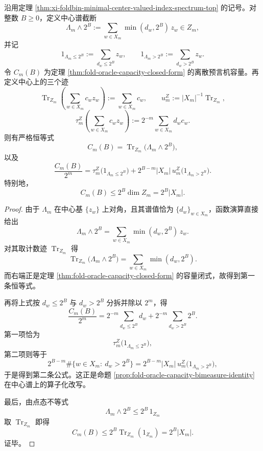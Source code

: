 \begin{theorem}[预言机容量是中心值指数元的谱截断迹]\label{thm:xi-foldbin-oracle-capacity-central-spectral-truncation}
沿用定理 \ref{thm:xi-foldbin-minimal-center-valued-index-spectrum-top} 的记号。对整数 \(B\ge 0\)，定义中心谱截断
\[
\Lambda_m\wedge 2^B
:=
\sum_{w\in X_m}\min(d_w,2^B)\,z_w\in Z_m,
\]
并记
\[
1_{\Lambda_m\le 2^B}:=\sum_{d_w\le 2^B}z_w,
\qquad
1_{\Lambda_m>2^B}:=\sum_{d_w>2^B}z_w.
\]
令 \(C_m(B)\) 为定理 \ref{thm:fold-oracle-capacity-closed-form} 的离散预言机容量。再定义中心上的三个迹
\[
\operatorname{Tr}_{Z_m}\!\left(\sum_{w\in X_m}c_w z_w\right):=\sum_{w\in X_m}c_w,
\qquad
u_m^Z:=|X_m|^{-1}\operatorname{Tr}_{Z_m},
\]
\[
\tau_m^Z\!\left(\sum_{w\in X_m}c_w z_w\right)
:=
2^{-m}\sum_{w\in X_m}d_w c_w.
\]
则有严格恒等式
\[
C_m(B)=\operatorname{Tr}_{Z_m}\!\bigl(\Lambda_m\wedge 2^B\bigr),
\]
以及
\[
\frac{C_m(B)}{2^m}
=
\tau_m^Z\!\bigl(1_{\Lambda_m\le 2^B}\bigr)
+
2^{B-m}|X_m|\,u_m^Z\!\bigl(1_{\Lambda_m>2^B}\bigr).
\]
特别地，
\[
C_m(B)\le 2^B\dim Z_m=2^B|X_m|.
\]
\end{theorem}
\begin{proof}
由于 \(\Lambda_m\) 在中心基 \(\{z_w\}\) 上对角，且其谱值恰为 \(\{d_w\}_{w\in X_m}\)，函数演算直接给出
\[
\Lambda_m\wedge 2^B
=
\sum_{w\in X_m}\min(d_w,2^B)\,z_w.
\]
对其取计数迹 \(\operatorname{Tr}_{Z_m}\) 得
\[
\operatorname{Tr}_{Z_m}\!\bigl(\Lambda_m\wedge 2^B\bigr)
=
\sum_{w\in X_m}\min(d_w,2^B).
\]
而右端正是定理 \ref{thm:fold-oracle-capacity-closed-form} 的容量闭式，故得到第一条恒等式。

再将上式按 \(d_w\le 2^B\) 与 \(d_w>2^B\) 分拆并除以 \(2^m\)，得
\[
\frac{C_m(B)}{2^m}
=
2^{-m}\sum_{d_w\le 2^B}d_w
+
2^{-m}\sum_{d_w>2^B}2^B.
\]
第一项恰为
\[
\tau_m^Z\!\bigl(1_{\Lambda_m\le 2^B}\bigr),
\]
第二项则等于
\[
2^{B-m}\#\{w\in X_m:\ d_w>2^B\}
=
2^{B-m}|X_m|\,u_m^Z\!\bigl(1_{\Lambda_m>2^B}\bigr),
\]
于是得到第二条公式。这正是命题 \ref{prop:fold-oracle-capacity-bimeasure-identity} 在中心谱上的算子化改写。

最后，由点态不等式
\[
\Lambda_m\wedge 2^B\le 2^B\,1_{Z_m}
\]
取 \(\operatorname{Tr}_{Z_m}\) 即得
\[
C_m(B)\le 2^B\operatorname{Tr}_{Z_m}(1_{Z_m})=2^B|X_m|.
\]
证毕。
\end{proof}

